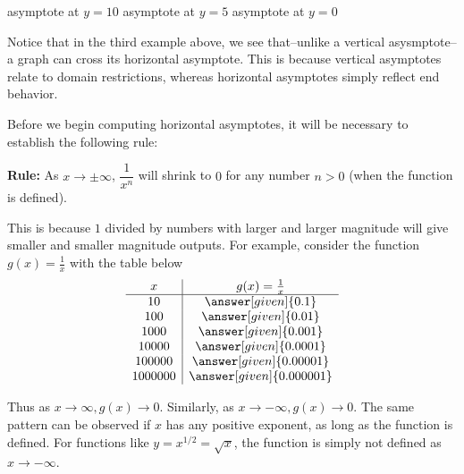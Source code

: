 \documentclass{ximera}
\begin{document}
{\scriptsize \hfill asymptote at $y=10$ \hfill asymptote at $y=5$ \hfill asymptote at $y=0$\hfill}

Notice that in the third example above, we see that--unlike a vertical asysmptote--a graph can cross its horizontal asymptote. This is because vertical asymptotes relate to domain restrictions, whereas horizontal asymptotes simply reflect end behavior.
%
%
%
%

Before we begin computing horizontal asymptotes, it will be necessary to establish the following rule:
\vspace{.1in}

\textbf{Rule:} As $x\rightarrow\pm\infty$, $\dfrac{1}{x^n}$ will shrink to $0$ for any number $n>0$ (when the function is defined).
\vspace{.1in}

This is because $1$ divided by numbers with larger and larger magnitude will give smaller and smaller magnitude outputs. For example, consider the function $g(x) = \frac{1}{x}$ with the table below
	$$ \begin{array}{c|c}
		x       & g(x)=\frac{1}{x} \\\hline
		10      & \answer[given]{0.1} \\ 
		100     & \answer[given]{0.01} \\
		1000    & \answer[given]{0.001} \\
		10000   & \answer[given]{0.0001} \\
		100000  & \answer[given]{0.00001}\\
		1000000 & \answer[given]{0.000001}
	\end{array} $$

Thus as $x\rightarrow\infty,g(x)\rightarrow 0$. Similarly, as $x\rightarrow -\infty,g(x)\rightarrow 0$. The same pattern can be observed if $x$ has any positive exponent, as long as the function is defined. For functions like $y=x^{1/2}=\sqrt{x}$, the function is simply not defined as $x\rightarrow -\infty$.
\end{document}
